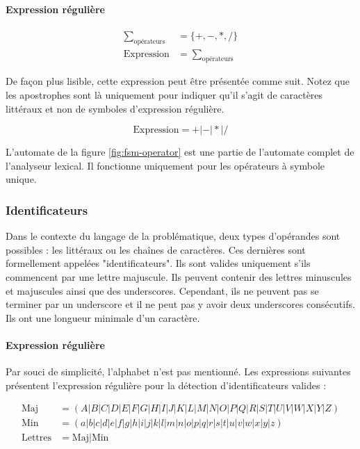\paragraph{Expression régulière}

\begin{align}
  \sum_{\textrm{opérateurs}} &= \{+,-,*,/\} \\
  \textrm{Expression} &= \sum_{\textrm{opérateurs}}
\end{align}

De façon plus lisible, cette expression peut être présentée comme suit. Notez
que les apostrophes sont là uniquement pour indiquer qu’il s’agit de
caractères littéraux et non de symboles d'expression régulière.

\begin{equation}
  \textrm{Expression} = +|-|*|/
\end{equation}

L'automate de la figure \ref{fig:fsm-operator} est une partie de l'automate
complet de l'analyseur lexical. Il fonctionne uniquement pour les opérateurs
à symbole unique.

\subsubsection{Identificateurs}

Dans le contexte du langage de la problématique, deux types d'opérandes sont
possibles : les littéraux ou les chaînes de caractères. Ces dernières sont
formellement appelées "identificateurs". Ils sont valides uniquement s'ils
commencent par une lettre majuscule. Ils peuvent contenir des lettres
minuscules et majuscules ainsi que des underscores. Cependant, ils ne peuvent
pas se terminer par un underscore et il ne peut pas y avoir deux underscores
consécutifs. Ils ont une longueur minimale d’un caractère.

\paragraph{Expression régulière}

Par souci de simplicité, l'alphabet n'est pas mentionné. Les expressions
suivantes présentent l'expression régulière pour la détection d'identificateurs
valides :

\begin{align}
  \textrm{Maj} &= (A|B|C|D|E|F|G|H|I|J|K|L|M|N|O|P|Q|R|S|T|U|V|W|X|Y|Z) \\
  \textrm{Min} &= (a|b|c|d|e|f|g|h|i|j|k|l|m|n|o|p|q|r|s|t|u|v|w|x|y|z) \\
  \textrm{Lettres} &= \textrm{Maj} | \textrm{Min}
\end{align}

